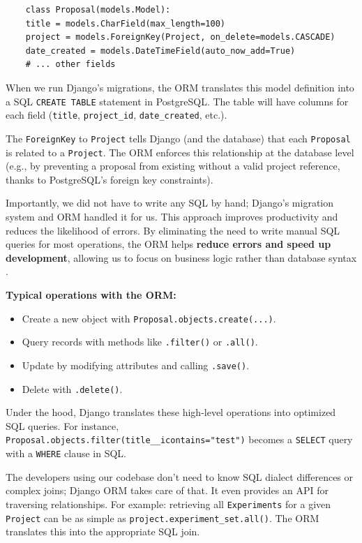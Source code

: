 \begin{verbatim}
	class Proposal(models.Model): 
	title = models.CharField(max_length=100) 
	project = models.ForeignKey(Project, on_delete=models.CASCADE) 
	date_created = models.DateTimeField(auto_now_add=True) 
	# ... other fields
\end{verbatim}

When we run Django’s migrations, the ORM translates this model definition into 
a SQL \texttt{CREATE TABLE} statement in PostgreSQL. The table will have 
columns for each field (\texttt{title}, \texttt{project\_id}, 
\texttt{date\_created}, etc.). 

The \texttt{ForeignKey} to \texttt{Project} tells Django (and the database) 
that each \texttt{Proposal} is related to a \texttt{Project}. The ORM enforces 
this relationship at the database level (e.g., by preventing a proposal from 
existing without a valid project reference, thanks to PostgreSQL’s foreign key 
constraints). 

Importantly, we did not have to write any SQL by hand; Django’s migration 
system and ORM handled it for us. This approach improves productivity and 
reduces the likelihood of errors. By eliminating the need to write manual SQL 
queries for most operations, the ORM helps \textbf{reduce errors and speed up 
	development}, allowing us to focus on business logic rather than database 
syntax \parencite{DjangoORMQueries}. 

\medskip

\noindent
\textbf{Typical operations with the ORM:}
\begin{itemize}
	\item Create a new object with \texttt{Proposal.objects.create(...)}.
	\item Query records with methods like \texttt{.filter()} or \texttt{.all()}.
	\item Update by modifying attributes and calling \texttt{.save()}.
	\item Delete with \texttt{.delete()}.
\end{itemize}

Under the hood, Django translates these high-level operations into optimized 
SQL queries. For instance, 
\texttt{Proposal.objects.filter(title\_\_icontains="test")} becomes a 
\texttt{SELECT} query with a \texttt{WHERE} clause in SQL. 

The developers using our codebase don’t need to know SQL dialect differences 
or complex joins; Django ORM takes care of that. It even provides an API for 
traversing relationships. For example: retrieving all \texttt{Experiments} for 
a given \texttt{Project} can be as simple as 
\texttt{project.experiment\_set.all()}. The ORM translates this into the 
appropriate SQL join. 

